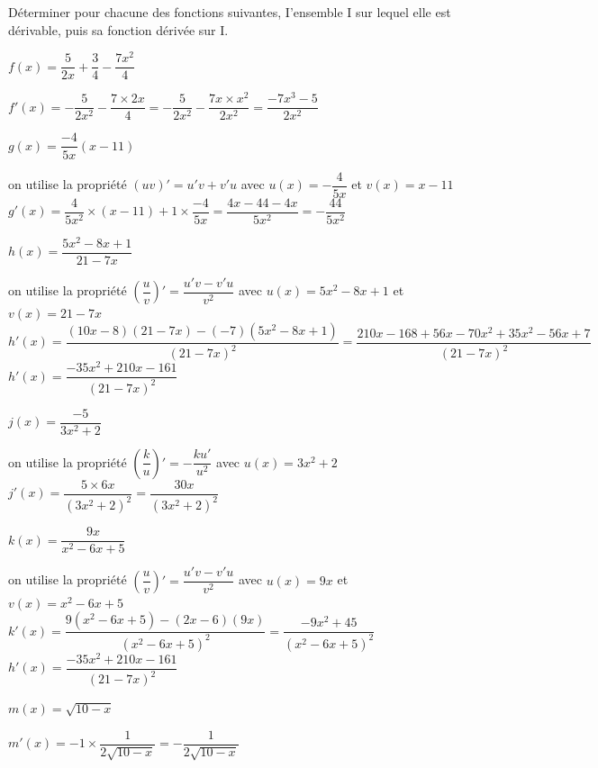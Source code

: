 \documentclass[11pt,a4paper]{article}  %
\begin{document}
Déterminer pour chacune des fonctions suivantes, I'ensemble I sur lequel elle est dérivable, puis sa fonction dérivée sur $\mathrm{I}$.
	\begin{enumMet}
		\item $f(x)=\dfrac{5}{2 x}+\dfrac{3}{4}-\dfrac{7 x^2}{4}$
		\begin{corrBox}
			$f'(x)=-\dfrac{5}{2x^2}-\dfrac{7\times2x}{4}=-\dfrac{5}{2x^2}-\dfrac{7x\times x^2}{2x^2}=\dfrac{-7x^3-5}{2x^2}$
		\end{corrBox}
		\item $g(x)=\dfrac{-4}{5 x}(x-11)$
		\begin{corrBox}
			on utilise la propriété $(uv)'=u'v+v'u$ avec $u(x)=-\dfrac{4}{5x}$ et $v(x)=x-11$\\
			$g'(x)=\dfrac{4}{5x^2}\times(x-11)+1\times\dfrac{-4}{5x}=\dfrac{4x-44-4x}{5x^2}=-\dfrac{44}{5x^2}$
		\end{corrBox}
		\item $h(x)=\dfrac{5 x^2-8 x+1}{21-7 x}$
		\begin{corrBox}
			on utilise la propriété $\left(\dfrac{u}{v}\right)'=\dfrac{u'v-v'u}{v^2}$ avec $u(x)=5 x^2-8 x+1$ et $v(x)=21-7 x$\\
			$h'(x)=\dfrac{(10x-8)(21-7x)-(-7)(5x^2-8x+1)}{(21-7x)^2}=\dfrac{210x-168+56x-70x^2+35x^2-56x+7}{(21-7x)^2}$\\
			$h'(x)=\dfrac{-35x^2+210x-161}{(21-7x)^2}$
		\end{corrBox}
		\item $j(x)=\dfrac{-5}{3 x^2+2}$
		\begin{corrBox}
			on utilise la propriété $\left(\dfrac{k}{u}\right)'=-\dfrac{ku'}{u^2}$ avec $u(x)=3x^2+2$\\
			$j'(x)=\dfrac{5\times6x}{(3x^2+2)^2}=\dfrac{30x}{(3x^2+2)^2}$
		\end{corrBox}
		\item $k(x)=\dfrac{9 x}{x^2-6 x+5}$
		\begin{corrBox}
			on utilise la propriété $\left(\dfrac{u}{v}\right)'=\dfrac{u'v-v'u}{v^2}$ avec $u(x)=9x$ et $v(x)=x^2-6x+5$\\
			$k'(x)=\dfrac{9(x^2-6x+5)-(2x-6)(9x)}{(x^2-6x+5)^2}=\dfrac{-9x^2+45}{(x^2-6x+5)^2}$\\
			$h'(x)=\dfrac{-35x^2+210x-161}{(21-7x)^2}$
		\end{corrBox}
		\item $m(x)=\sqrt{10-x}$
		\begin{corrBox}
			$m'(x)=-1\times \dfrac{1}{2\sqrt{10-x}}=-\dfrac{1}{2\sqrt{10-x}}$
		\end{corrBox}
	\end{enumMet}
\end{document}
